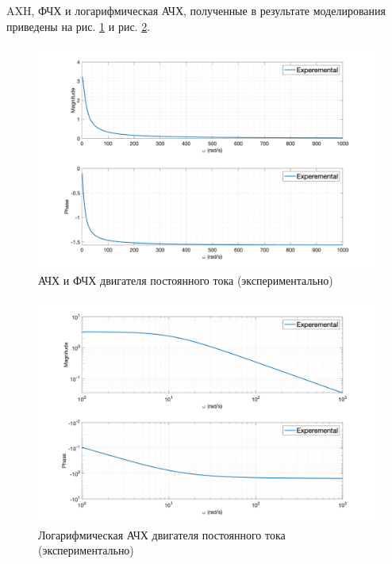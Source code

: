 AXH, ФЧХ и логарифмическая АЧХ, полученные в результате моделирования приведены на рис. \ref{fig:task1_freq_resp_exp_lin} и рис. \ref{fig:task1_freq_resp_exp_loglog}.
\begin{figure}[ht!]
    \centering
    \includegraphics[width=\textwidth]{media/plots/task1_freq_resp_exp_lin.png}
    \caption{АЧХ и ФЧХ двигателя постоянного тока (экспериментально)}
    \label{fig:task1_freq_resp_exp_lin}
\end{figure}
\begin{figure}[ht!]
    \centering
    \includegraphics[width=\textwidth]{media/plots/task1_freq_resp_exp_loglog.png}
    \caption{Логарифмическая АЧХ двигателя постоянного тока (экспериментально)}
    \label{fig:task1_freq_resp_exp_loglog}
\end{figure}

